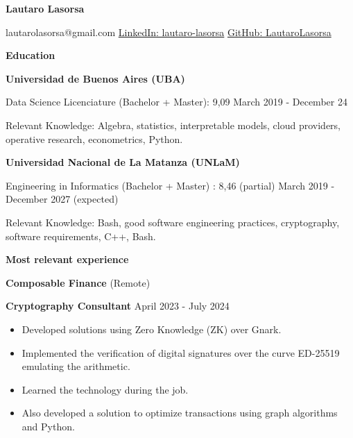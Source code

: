 \documentclass[11pt]{article}
\begin{document}
\begin{center}
    \textbf{Lautaro Lasorsa}\\ 
    \hrulefill
\end{center}

\begin{center}
    lautarolasorsa@gmail.com \textbullet \href{https://www.linkedin.com/in/lautaro-lasorsa/}{LinkedIn: lautaro-lasorsa} \textbullet \href{https://github.com/LautaroLasorsa}{GitHub: LautaroLasorsa}
\end{center}

\vspace{0.5pt}

\begin{center}
    \textbf{Education}
\end{center}
\textbf{Universidad de Buenos Aires (UBA)} 

Data Science Licenciature (Bachelor + Master): 9,09 \hfill March 2019 - December 24 

Relevant Knowledge: Algebra, statistics, interpretable models, cloud providers, operative research, econometrics, Python.

\vspace{24pt}

\textbf{Universidad Nacional de La Matanza (UNLaM)} 

Engineering in Informatics (Bachelor + Master) : 8,46 (partial) \hfill March 2019 - December 2027 (expected)

Relevant Knowledge: Bash, good software engineering practices, cryptography, software requirements, C++, Bash.

\vspace{24pt}

\begin{center}
    \textbf{Most relevant experience}
\end{center}
\textbf{Composable Finance} \hfill (Remote)

\textbf{Cryptography Consultant} \hfill April 2023 - July 2024
\begin{itemize}[noitemsep, topsep=0pt, partopsep=0pt, parsep=0pt]
    \item Developed solutions using Zero Knowledge (ZK) over Gnark.
    \item Implemented the verification of digital signatures over the curve ED-25519 emulating the arithmetic.
    \item Learned the technology during the job.
    \item Also developed a solution to optimize transactions using graph algorithms and Python.
\end{itemize}
\end{document}

